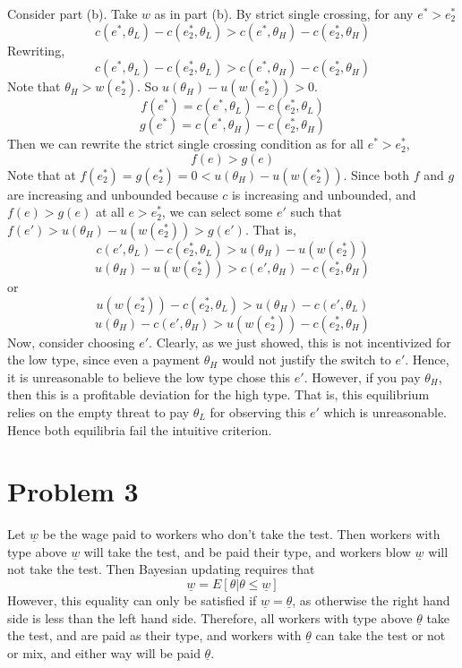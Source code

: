 \documentclass[10pt,letter]{article}
\begin{document}
\begin{enumerate}[label=(\alph*)]
Consider part (b). Take $w$ as in part (b). By strict single crossing, for any $e^* > e_2^*$
\[ c(e^*, \theta_L) - c(e_2^*, \theta_L) > c(e^*, \theta_H) - c(e_2^*, \theta_H)  \]
Rewriting,
\[ c(e^*, \theta_L) - c(e_2^*, \theta_L) > c(e^*, \theta_H) - c(e_2^*, \theta_H)  \]
Note that $\theta_H > w(e_2^*)$. So $ u(\theta_H) - u(w(e_2^*)) > 0 $.
\[ f(e^*) = c(e^*, \theta_L) - c(e_2^*, \theta_L)  \]
\[ g(e^*) = c(e^*, \theta_H) - c(e_2^*, \theta_H) \]
Then we can rewrite the strict single crossing condition as for all $e^* > e_2^*$,
\[ f(e) > g(e) \]
Note that at $f(e_2^*) = g(e_2^*) = 0 < u(\theta_H) - u(w(e_2^*))$. Since both $f$ and $g$ are increasing and unbounded because $c$ is increasing and unbounded, and $f(e) > g(e)$ at all $e > e_2^*$, we can select some $e'$ such that $f(e') > u(\theta_H) - u(w(e_2^*)) > g(e')$. That is,
\[ c(e', \theta_L) - c(e_2^*, \theta_L) > u(\theta_H) - u(w(e_2^*))\]
\[ u(\theta_H) - u(w(e_2^*)) > c(e', \theta_H) - c(e_2^*, \theta_H) \]
or
\[ u(w(e_2^*)) - c(e_2^*, \theta_L) > u(\theta_H) - c(e', \theta_L)\]
\[ u(\theta_H) - c(e', \theta_H) > u(w(e_2^*)) - c(e_2^*, \theta_H) \]
Now, consider choosing $e'$. Clearly, as we just showed, this is not incentivized for the low type, since even a payment $\theta_H$ would not justify the switch to $e'$. Hence, it is unreasonable to believe the low type chose this $e'$. However, if you pay $\theta_H$, then this is a profitable deviation for the high type. That is, this equilibrium relies on the empty threat to pay $\theta_L$ for observing this $e'$ which is unreasonable. Hence both equilibria fail the intuitive criterion.

\end{enumerate}
\section*{Problem 3}
Let $\underline{w}$ be the wage paid to workers who don't take the test. Then workers with type above $\underline{w}$ will take the test, and be paid their type, and workers blow $\underline{w}$ will not take the test. Then Bayesian updating requires that
\[ \underline{w} = E[\theta | \theta \le \underline{w}] \]
However, this equality can only be satisfied if $\underline{w} = \underline{\theta}$, as otherwise the right hand side is less than the left hand side. Therefore, all workers with type above $\underline{\theta}$ take the test, and are paid as their type, and workers with $\underline{\theta}$ can take the test or not or mix, and either way will be paid $\underline{\theta}$.
\end{document}
